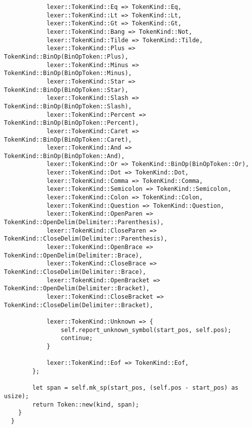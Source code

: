 \begin{lstlisting}
            lexer::TokenKind::Eq => TokenKind::Eq,
            lexer::TokenKind::Lt => TokenKind::Lt,
            lexer::TokenKind::Gt => TokenKind::Gt,
            lexer::TokenKind::Bang => TokenKind::Not,
            lexer::TokenKind::Tilde => TokenKind::Tilde,
            lexer::TokenKind::Plus => TokenKind::BinOp(BinOpToken::Plus),
            lexer::TokenKind::Minus => TokenKind::BinOp(BinOpToken::Minus),
            lexer::TokenKind::Star => TokenKind::BinOp(BinOpToken::Star),
            lexer::TokenKind::Slash => TokenKind::BinOp(BinOpToken::Slash),
            lexer::TokenKind::Percent => TokenKind::BinOp(BinOpToken::Percent),
            lexer::TokenKind::Caret => TokenKind::BinOp(BinOpToken::Caret),
            lexer::TokenKind::And => TokenKind::BinOp(BinOpToken::And),
            lexer::TokenKind::Or => TokenKind::BinOp(BinOpToken::Or),
            lexer::TokenKind::Dot => TokenKind::Dot,
            lexer::TokenKind::Comma => TokenKind::Comma,
            lexer::TokenKind::Semicolon => TokenKind::Semicolon,
            lexer::TokenKind::Colon => TokenKind::Colon,
            lexer::TokenKind::Question => TokenKind::Question,
            lexer::TokenKind::OpenParen => TokenKind::OpenDelim(Delimiter::Parenthesis),
            lexer::TokenKind::CloseParen => TokenKind::CloseDelim(Delimiter::Parenthesis),
            lexer::TokenKind::OpenBrace => TokenKind::OpenDelim(Delimiter::Brace),
            lexer::TokenKind::CloseBrace => TokenKind::CloseDelim(Delimiter::Brace),
            lexer::TokenKind::OpenBracket => TokenKind::OpenDelim(Delimiter::Bracket),
            lexer::TokenKind::CloseBracket => TokenKind::CloseDelim(Delimiter::Bracket),

            lexer::TokenKind::Unknown => {
                self.report_unknown_symbol(start_pos, self.pos);
                continue;
            }

            lexer::TokenKind::Eof => TokenKind::Eof,
        };

        let span = self.mk_sp(start_pos, (self.pos - start_pos) as usize);
        return Token::new(kind, span);
    }
  }
\end{lstlisting}

